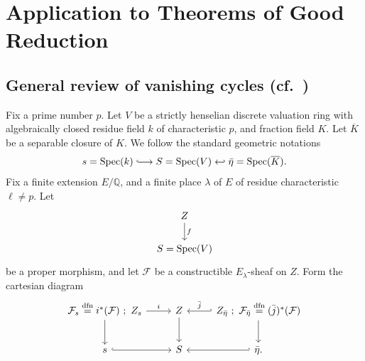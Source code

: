 \chapter{Application to Theorems of Good Reduction}
\label{ch:14}

\section{General review of vanishing cycles (cf.\ \cite[7, Exp.~XIII, 2]{SGA})}
\label{sec:14.1}

\kmitem\label{item:14.1.1}
Fix a prime number $p$.
Let $V$ be a strictly henselian discrete valuation ring with algebraically closed residue field $k$ of characteristic $p$, and fraction field $K$. Let $\overline{K}$ be a separable closure of $K$. We follow the standard geometric notations
\begin{equation}\label{eq:14.1.1.1}
s = \Spec(k) \mathrel{\lhook\joinrel\longrightarrow} S = \Spec(V) \hookleftarrow \bar{\eta} = \Spec(\overline{K}) .
\end{equation}
Fix a finite extension $E/\mathbb{Q}$, and a finite place $\lambda$ of $E$ of residue characteristic $\ell \neq p$. Let
\begin{equation}\label{eq:14.1.1.2}
\begin{tikzcd}[row sep=1.8em]
Z \arrow[d, "f"] \\
S = \Spec(V)
\end{tikzcd}
\end{equation}
be a proper morphism, and let $\mathcal{F}$ be a constructible $E_\lambda$-sheaf on $Z$. Form the cartesian diagram
\begin{equation}\label{eq:14.1.1.3}
\begin{tikzcd}[column sep=2.5em, row sep=2.2em]
\mathcal{F}_s \overset{\mathrm{dfn}}{=} i^*(\mathcal{F})\ ;\ Z_s \arrow[r, "i"] \arrow[d] & Z \arrow[d] & Z_{\bar{\eta}}\ ;\ \mathcal{F}_{\bar{\eta}} \overset{\mathrm{dfn}}{=} (\bar{j})^*(\mathcal{F}) \arrow[l, hook', "\bar{j}"'] \arrow[d] \\
s \arrow[r, hook] & S & \bar{\eta} \arrow[l, hook'] .
\end{tikzcd}
\end{equation}

